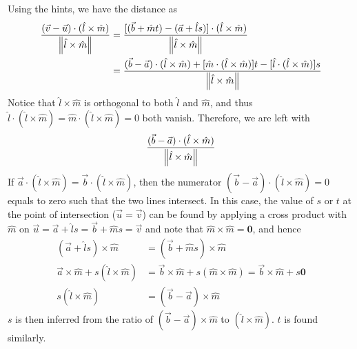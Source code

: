 \begin{Answer}
Using the hints, we have the distance as
\begin{align*}
\frac{(\vec{v} - \vec{u}) \cdot (\hat{l} \times \hat{m})}{\norm{\hat{l} \times \hat{m}}} &= \frac{[(\vec{b} + \hat{m}t) - (\vec{a} + \hat{l}s)] \cdot (\hat{l} \times \hat{m})}{\norm{\hat{l} \times \hat{m}}} \\
&= \frac{(\vec{b} - \vec{a}) \cdot (\hat{l} \times \hat{m}) + [\hat{m} \cdot (\hat{l} \times \hat{m})] t - [\hat{l} \cdot (\hat{l} \times \hat{m})] s}{\norm{\hat{l} \times \hat{m}}}
\end{align*}
Notice that $\hat{l} \times \hat{m}$ is orthogonal to both $\hat{l}$ and $\hat{m}$, and thus $\hat{l} \cdot (\hat{l} \times \hat{m}) = \hat{m} \cdot (\hat{l} \times \hat{m}) = 0$ both vanish. Therefore, we are left with
\begin{align*}
\frac{(\vec{b} - \vec{a}) \cdot (\hat{l} \times \hat{m})}{\norm{\hat{l} \times \hat{m}}} 
\end{align*} 
If $\vec{a} \cdot (\hat{l} \times \hat{m}) = \vec{b} \cdot (\hat{l} \times \hat{m})$, then the numerator $(\vec{b} - \vec{a}) \cdot (\hat{l} \times \hat{m}) = 0$ equals to zero such that the two lines intersect. In this case, the value of $s$ or $t$ at the point of intersection ($\vec{u} = \vec{v}$) can be found by applying a cross product with $\hat{m}$ on $\vec{u} = \vec{a} + \hat{l}s = \vec{b} + \hat{m}s = \vec{v}$ and note that $\hat{m} \times \hat{m} = \textbf{0}$, and hence
\begin{align*}
(\vec{a} + \hat{l}s) \times \hat{m} &= (\vec{b} + \hat{m}s) \times \hat{m} \\
\vec{a} \times \hat{m} + s(\hat{l} \times \hat{m}) &= \vec{b} \times \hat{m} + s (\hat{m} \times \hat{m}) =  \vec{b} \times \hat{m} + s\textbf{0}\\
s (\hat{l} \times \hat{m}) &= (\vec{b} - \vec{a}) \times \hat{m}
\end{align*}
$s$ is then inferred from the ratio of $(\vec{b} - \vec{a}) \times \hat{m}$ to $(\hat{l} \times \hat{m})$. $t$ is found similarly.
\end{Answer}

